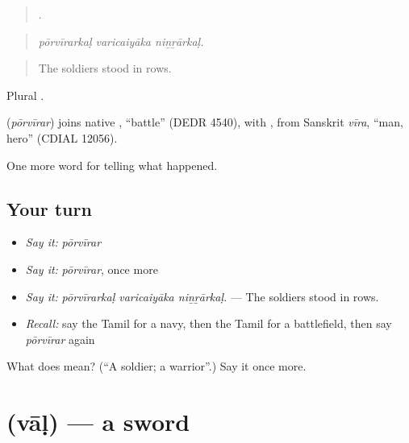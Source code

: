 \begin{quote}
  .
\end{quote}

\begin{quote}
\emph{pōrvīrarkaḷ varicaiyāka niṉṟārkaḷ.}
\end{quote}

\begin{quote}
The soldiers stood in rows.
\end{quote}

Plural .

\begin{cousinweb}
\textbf{} (\emph{pōrvīrar}) joins native , \textquotedblleft{}battle\textquotedblright{} (DEDR 4540), with , from Sanskrit \emph{vīra}, \textquotedblleft{}man, hero\textquotedblright{} (CDIAL 12056).
\end{cousinweb}

\begin{grammarlens}[title={What you've built}]
One more word for telling what happened.
\end{grammarlens}

\subsection*{Your turn}
\begin{itemize}
\raggedright
  \item \emph{Say it:} \emph{pōrvīrar}
  \item \emph{Say it:} \emph{pōrvīrar}, once more
  \item \emph{Say it:} \emph{pōrvīrarkaḷ varicaiyāka niṉṟārkaḷ.} — The soldiers stood in rows.
  \item \emph{Recall:} say the Tamil for a navy, then the Tamil for a battlefield, then say \emph{pōrvīrar} again
\end{itemize}

\begin{tcolorbox}[breakable,colback=teal!4,colframe=teal!35!black,title={Before you move on}]
What does  mean? (\textquotedblleft{}A soldier; a warrior\textquotedblright{}.) Say it once more.
\end{tcolorbox}
\section[\texorpdfstring{\ta{வாள்} (vāḷ)}{வாள் (vāḷ)}]{ (vāḷ) — a sword}

